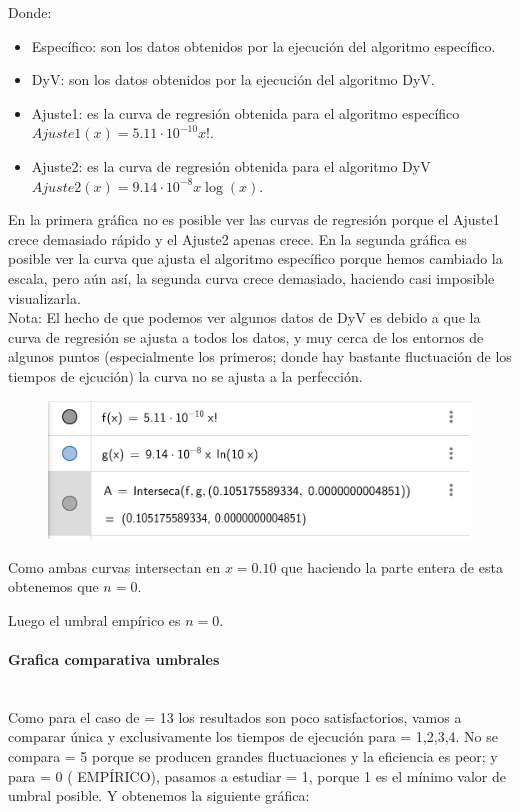 \documentclass{article}
\newcommand{\myparagraph}[1]{\paragraph{#1}\mbox{}\\}
\begin{document}
    Donde:
    \begin{itemize}
        \item Específico: son los datos obtenidos por la ejecución del algoritmo específico.
        \item DyV: son los datos obtenidos por la ejecución del algoritmo DyV.
        \item Ajuste1: es la curva de regresión obtenida para el algoritmo específico $Ajuste1(x) = 5.11\cdot 10^{-10} x!$.
        \item Ajuste2: es la curva de regresión obtenida para el algoritmo DyV $Ajuste2(x)= 9.14 \cdot 10^{-8} x \log(x)$. 
    \end{itemize}
    
    En la primera gráfica no es posible ver las curvas de regresión porque el Ajuste1 crece demasiado rápido y el Ajuste2 apenas crece.
    En la segunda gráfica es posible ver la curva que ajusta el algoritmo específico porque hemos cambiado la escala, pero aún así, la segunda curva crece demasiado, haciendo casi imposible visualizarla. \\
    Nota: El hecho de que podemos ver algunos datos de DyV es debido a que la curva de regresión se ajusta a todos los datos, y muy cerca de los entornos de algunos puntos (especialmente los primeros; donde hay bastante fluctuación de los tiempos de ejcución) la curva no se ajusta a la perfección. 
    
    \begin{figure}[H]
        \centering
        \includegraphics[scale=0.5]{P3/Geogebra/uwu_geobebra.png}
    \end{figure}

    Como ambas curvas intersectan en $x = 0.10$ que haciendo la parte entera de esta obtenemos que $n = 0$.
    
    Luego el umbral empírico es $n = 0$. 

\myparagraph{Grafica comparativa umbrales}

    Como para el caso de  = 13 los resultados son poco satisfactorios, vamos a comparar única y exclusivamente los tiempos 
    de ejecución para  = 1,2,3,4. No se compara  = 5 porque se producen grandes fluctuaciones y la eficiencia es peor; y para  = 0 ( EMPÍRICO), pasamos a estudiar  = 1, porque 1 es el mínimo valor de umbral posible. Y obtenemos la siguiente gráfica: 
\end{document}

